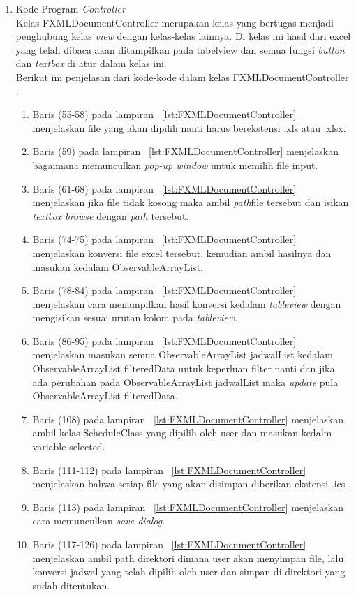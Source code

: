 \begin{enumerate}
\item Kode Program \textit{Controller} \\
Kelas FXMLDocumentController merupakan kelas yang bertugas menjadi penghubung kelas \textit{view} dengan kelas-kelas lainnya. Di kelas ini hasil dari excel yang telah dibaca akan ditampilkan pada tabelview dan semua fungsi \textit{button} dan  \textit{textbox} di atur dalam kelas ini. \\
Berikut ini penjelasan dari kode-kode dalam kelas FXMLDocumentController :
\begin{enumerate}
	\item Baris (55-58) pada lampiran ~\ref{lst:FXMLDocumentController} menjelaskan file yang akan dipilih nanti harus berekstensi .xls atau .xlsx.
	\item Baris (59) pada lampiran ~\ref{lst:FXMLDocumentController} menjelaskan bagaimana memunculkan \textit{pop-up window} untuk memilih file input.
	\item Baris (61-68) pada lampiran ~\ref{lst:FXMLDocumentController} menjelaskan jika file tidak kosong maka ambil \textit{path}file tersebut dan isikan \textit{textbox browse} dengan \textit{path} tersebut.
	\item Baris (74-75) pada lampiran ~\ref{lst:FXMLDocumentController} menjelaskan konversi file excel tersebut, kemudian ambil hasilnya dan masukan kedalam ObservableArrayList.
	\item Baris (78-84) pada lampiran ~\ref{lst:FXMLDocumentController} menjelaskan cara menampilkan hasil konversi kedalam \textit{tableview} dengan mengisikan sesuai urutan kolom pada \textit{tableview}.
	\item Baris (86-95) pada lampiran ~\ref{lst:FXMLDocumentController} menjelaskan masukan semua ObservableArrayList jadwalList kedalam ObservableArrayList filteredData untuk keperluan filter nanti dan jika ada perubahan pada ObservableArrayList jadwalList maka \textit{update} pula ObservableArrayList filteredData.
	\item Baris (108) pada lampiran ~\ref{lst:FXMLDocumentController} menjelaskan ambil kelas ScheduleClass yang dipilih oleh user dan masukan kedalm variable selected.
	\item Baris (111-112) pada lampiran ~\ref{lst:FXMLDocumentController} menjelaskan bahwa setiap file yang akan disimpan diberikan ekstensi .ics .
	\item Baris (113) pada lampiran ~\ref{lst:FXMLDocumentController} menjelaskan cara memunculkan \textit{save dialog}.
	\item Baris (117-126) pada lampiran ~\ref{lst:FXMLDocumentController} menjelaskan ambil path direktori dimana user akan menyimpan file, lalu konversi jadwal yang telah dipilih oleh user dan simpan di direktori yang sudah ditentukan.

\end{enumerate}
\end{enumerate}
